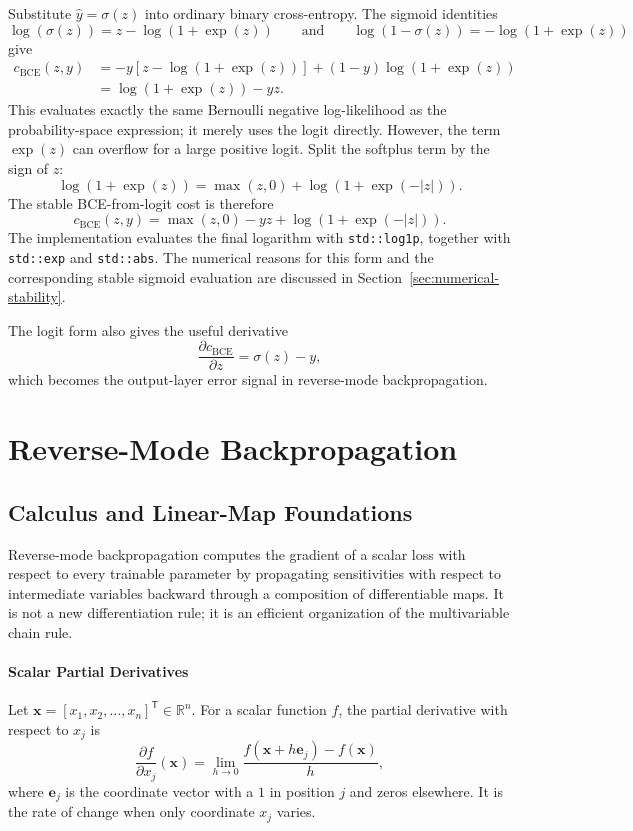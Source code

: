 \documentclass{article}
\begin{document}
Substitute \(\hat{y}=\sigma(z)\) into ordinary binary cross-entropy.
The sigmoid identities
\[
  \log\!\left(\sigma(z)\right)
  = z-\log\!\left(1+\exp(z)\right)
  \qquad \text{and} \qquad
  \log\!\left(1-\sigma(z)\right)
  =-\log\!\left(1+\exp(z)\right)
\]
give
\[
  \begin{aligned}
    c_{\mathrm{BCE}}(z,y)
    &=
    -y\left[z-\log\!\left(1+\exp(z)\right)\right]
    +(1-y)\log\!\left(1+\exp(z)\right)\\
    &=
    \log\!\left(1+\exp(z)\right)-yz.
  \end{aligned}
\]
This evaluates exactly the same Bernoulli negative log-likelihood as
the probability-space expression; it merely uses the logit directly.
However, the term \(\exp(z)\) can overflow for a large positive logit.
Split the softplus term by the sign of \(z\):
\[
  \log\!\left(1+\exp(z)\right)
  =
  \max(z,0)
  +
  \log\!\left(1+\exp\!\left(-\lvert z\rvert\right)\right).
\]
The stable BCE-from-logit cost is therefore
\[
  c_{\mathrm{BCE}}(z,y)
  =
  \max(z,0)
  -yz
  +
  \log\!\left(1+\exp\!\left(-\lvert z\rvert\right)\right).
\]
The implementation evaluates the final logarithm with
\texttt{std::log1p}, together with \texttt{std::exp} and
\texttt{std::abs}. The numerical reasons for this form and the
corresponding stable sigmoid evaluation are discussed in
Section~\ref{sec:numerical-stability}.

The logit form also gives the useful derivative
\[
  \frac{\partial c_{\mathrm{BCE}}}{\partial z}
  =
  \sigma(z)-y,
\]
which becomes the output-layer error signal in reverse-mode
backpropagation.

\section{Reverse-Mode Backpropagation}

\subsection{Calculus and Linear-Map Foundations}

Reverse-mode backpropagation computes the gradient of a scalar loss with
respect to every trainable parameter by propagating sensitivities with
respect to intermediate variables backward through a composition of
differentiable maps. It is not a new differentiation rule; it is an
efficient organization of the multivariable chain rule.

\paragraph{Scalar Partial Derivatives}
Let \(\mathbf{x}=[x_1,x_2,\ldots,x_n]^\mathsf{T}\in\mathbb{R}^n\). For
a scalar function \(f\), the partial derivative with respect to \(x_j\)
is
\[
  \frac{\partial f}{\partial x_j}(\mathbf{x})
  =
  \lim_{h\to 0}
  \frac{f(\mathbf{x}+h\mathbf{e}_j)-f(\mathbf{x})}{h},
\]
where \(\mathbf{e}_j\) is the coordinate vector with a \(1\) in
position \(j\) and zeros elsewhere. It is the rate of change when only
coordinate \(x_j\) varies.
\end{document}
